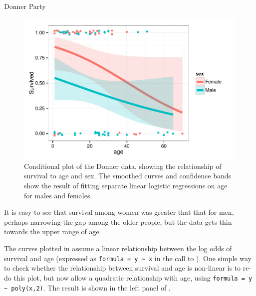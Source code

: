 \documentclass[11pt]{book}\usepackage[]{graphicx}\usepackage[]{color}
\newenvironment{knitrout}{}{} %
\renewenvironment{knitrout}{\small\renewcommand{\baselinestretch}{.85}}{} %
\begin{document}
\begin{Example}[donner1]{Donner Party}
\begin{knitrout}
\begin{figure}[!htbp]
\centerline{\includegraphics[width=.7\textwidth]{ch07/fig/donner1-cond1-1} }

\caption[Conditional plot of the Donner data, showing the relationship of survival to age and sex]{Conditional plot of the Donner data, showing the relationship of survival to age and sex. The smoothed curves and confidence bands show the result of fitting separate linear logistic regressions on age for males and females.\label{fig:donner1-cond1}}
\end{figure}


\end{knitrout}
It is easy to see that survival among women was greater that that for men,
perhaps narrowing the gap among the older people, but the data gets thin
towards the upper range of age.

The curves plotted in  assume a linear relationship between
the log odds of survival and age (expressed as \verb|formula = y ~ x| in the call to
).  One simple way to check whether the relationship between
survival and age is non-linear is to re-do this plot, but now allow a quadratic
relationship with age, using \verb|formula = y ~ poly(x,2)|. The result is shown
in the left panel of .


\end{Example}
\end{document}
